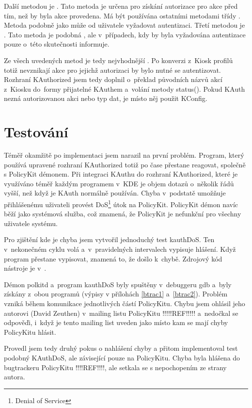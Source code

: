 Další metodou je . Tato metoda je určena pro získání autorizace pro akce před tím, než by byla akce provedena. Má být používána ostatními metodami třídy .  Metoda podobně jako  může od uživatele vyžadovat autentizaci. Třetí metodou je . Tato metoda je podobná , ale v~případech, kdy by byla vyžadována autentizace pouze o~této skutečnosti informuje.

Ze všech uvedených metod je tedy nejvhodnější . Po konverzi z~Kiosk profilů totiž nevznikají akce pro jejichž autorizaci by bylo nutné se autentizovat. Rozhraní KAuthorized jsem tedy doplnil o~překlad původních názvů akcí z~Kiosku do~formy přijatelné KAuthem a~volání metody status(). Pokud KAuth nezná autorizovanou akci nebo typ dat, je místo něj použit KConfig.

\section{Testování}
Téměř okamžitě po implementaci jsem narazil na první problém. Program, který používá upravené rozhraní KAuthorized totiž po čase přestane reagovat, společně s PolicyKit démonem. Při integraci KAuthu do rozhraní KAuthorized, které je využíváno téměř každým programem v~KDE je objem dotazů o~několik řádů vyšší, než když je KAuth normálně používán. Chyba v~podstatě umožňuje přihlášenému uživateli provést DoS\footnote{Denial of Service} útok na PolicyKit. PolicyKit démon navíc běží jako systémová služba, což znamená, že PolicyKit je nefunkční pro všechny uživatele systému.

Pro zjištění kde je chyba jsem vytvořil jednoduchý test kauthDoS. Ten v~nekonečném cyklu volá  a~v~pravidelných intervalech vypisuje hlášení. Když program přestane vypisovat, znamená to, že došlo k~chybě. Zdrojový kód nástroje je v~.

Démon polkitd a~program kauthDoS byly spuštěny v~debuggeru gdb a~byly získány  z~obou programů (výpisy v přílohách \ref{btrac1} a~\ref{btrac2}). Problém vzniká během komunikace jednotlivých částí PolicyKitu. Chybu jsem ohlásil jeho autorovi (David Zeuthen) v~mailing listu PolicyKitu !!!!!REF!!!!! a~nedočkal se odpověďi, i~když je tento mailing list uveden jako místo kam se mají chyby PolicyKitu hlásit.

Provedl jsem tedy druhý pokus o nahlášení chyby a přitom implementoval test podobný KAuthDoS, ale závisející pouze na PolicyKitu.
Chyba byla hlášena do bugtrackeru PolicyKitu !!!!REF!!!!, ale setkala se s nepochopením ze strany autora.

